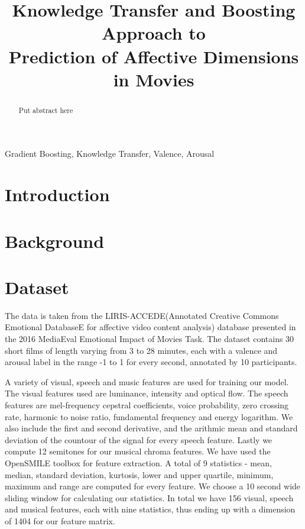\documentclass{article}
\title{Knowledge Transfer and Boosting Approach to \\Prediction of Affective Dimensions in Movies}
\begin{document}
\ninept
%
\maketitle
%
\begin{abstract}
   Put abstract here 
 
\end{abstract}
%
\begin{keywords}
Gradient Boosting, Knowledge Transfer, Valence, Arousal
\end{keywords}
%
\section{Introduction}
\label{sec:intro}

\section{Background}


\section{Dataset}
The data is taken from the LIRIS-ACCEDE(Annotated Creative Commons Emotional DatabaseE for affective video content analysis) database \cite{baveye2015liris} presented in the 2016 MediaEval Emotional Impact of Movies Task. The dataset contains 30 short films of length varying from 3 to 28 minutes, each with a valence and arousal label in the range -1 to 1 for every second, annotated by 10 participants.

\indent  A variety of visual, speech and music features are used for training our model. The visual features used are luminance, intensity and optical flow. The speech features are mel-frequency cepstral coefficients, voice probability, zero crossing rate, harmonic to noise ratio, fundamental frequency and energy logarithm. We also include the first and second derivative, and the arithmic mean and standard deviation of the countour of the signal for every speech feature. Lastly we compute 12 semitones for our musical chroma features. We have used the OpenSMILE toolbox for feature extraction. A total of 9 statistics - mean, median, standard deviation, kurtosis, lower and upper quartile, minimum, maximum and range are computed for every feature. We choose a 10 second wide sliding window for calculating our statistics. In total we have 156 visual, speech and musical features, each with nine statistics, thus ending up with a dimension of 1404 for our feature matrix.
\end{document}
